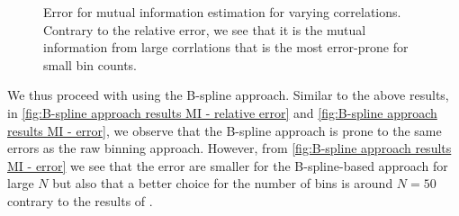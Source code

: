 \documentclass[../Thesis.tex]{subfiles}
\begin{document}
\begin{figure}[H]
\begin{subfigure}[t]{0.4\textwidth}
        \caption{}
    \end{subfigure}
    \caption{Error for mutual information estimation for varying correlations. Contrary to the relative error, we see that it is the mutual information from large corrlations that is the most error-prone for small bin counts.}
    \label{fig:raw hsitogram error for MI estimation}
\end{figure}
We thus proceed with using the B-spline approach. Similar to the above results, in \autoref{fig:B-spline approach results MI - relative error} and \autoref{fig:B-spline approach results MI - error}, we observe that the B-spline approach is prone to the same errors as the raw binning approach. However, from \autoref{fig:B-spline approach results MI - error} we see that the error are smaller for the B-spline-based approach for large $N$ but also that a better choice for the number of bins is around $N = 50$ contrary to the results of \cite{Network-deconvolution-as-a-general-method-to-distinguish-direct-dependencies-in-networks}.
\end{document}
